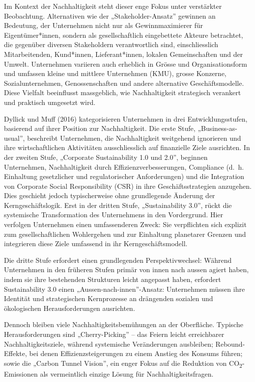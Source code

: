 \documentclass[
  nswissgerman,
  a4paper,
  openany]{book}
\begin{document}
Im Kontext der Nachhaltigkeit steht dieser enge Fokus unter verstärkter
Beobachtung. Alternativen wie der „Stakeholder-Ansatz'' gewinnen an
Bedeutung, der Unternehmen nicht nur als Gewinnmaximierer für
Eigentümer*innen, sondern als gesellschaftlich eingebettete Akteure
betrachtet, die gegenüber diversen Stakeholdern verantwortlich sind,
einschliesslich Mitarbeitenden, Kund*innen, Lieferant*innen, lokalen
Gemeinschaften und der Umwelt. Unternehmen variieren auch erheblich in
Grösse und Organisationsform und umfassen kleine und mittlere
Unternehmen (KMU), grosse Konzerne, Sozialunternehmen, Genossenschaften
und andere alternative Geschäftsmodelle. Diese Vielfalt beeinflusst
massgeblich, wie Nachhaltigkeit strategisch verankert und praktisch
umgesetzt wird.

Dyllick und Muff (2016) kategorisieren Unternehmen in drei
Entwicklungsstufen, basierend auf ihrer Position zur Nachhaltigkeit. Die
erste Stufe, „Business-as-usual'', beschreibt Unternehmen, die
Nachhaltigkeit weitgehend ignorieren und ihre wirtschaftlichen
Aktivitäten ausschliesslich auf finanzielle Ziele ausrichten. In der
zweiten Stufe, „Corporate Sustainability 1.0 und 2.0'', beginnen
Unternehmen, Nachhaltigkeit durch Effizienzverbesserungen, Compliance
(d.~h. Einhaltung gesetzlicher und regulatorischer Anforderungen) und
die Integration von Corporate Social Responsibility (CSR) in ihre
Geschäftsstrategien anzugehen. Dies geschieht jedoch typischerweise ohne
grundlegende Änderung der Kerngeschäftslogik. Erst in der dritten Stufe,
„Sustainability 3.0'', rückt die systemische Transformation des
Unternehmens in den Vordergrund. Hier verfolgen Unternehmen einen
umfassenderen Zweck: Sie verpflichten sich explizit zum
gesellschaftlichen Wohlergehen und zur Einhaltung planetarer Grenzen und
integrieren diese Ziele umfassend in ihr Kerngeschäftsmodell.

Die dritte Stufe erfordert einen grundlegenden Perspektivwechsel:
Während Unternehmen in den früheren Stufen primär von innen nach aussen
agiert haben, indem sie ihre bestehenden Strukturen leicht angepasst
haben, erfordert Sustainability 3.0 einen „Aussen-nach-innen''-Ansatz:
Unternehmen müssen ihre Identität und strategischen Kernprozesse an
drängenden sozialen und ökologischen Herausforderungen ausrichten.

Dennoch bleiben viele Nachhaltigkeitsbemühungen an der Oberfläche.
Typische Herausforderungen sind „Cherry-Picking'' -- das Feiern leicht
erreichbarer Nachhaltigkeitsziele, während systemische Veränderungen
ausbleiben; Rebound-Effekte, bei denen Effizienzsteigerungen zu einem
Anstieg des Konsums führen; sowie die „Carbon Tunnel Vision'', ein enger
Fokus auf die Reduktion von CO\textsubscript{2}-Emissionen als
vermeintlich einzige Lösung für Nachhaltigkeitsfragen.
\end{document}

